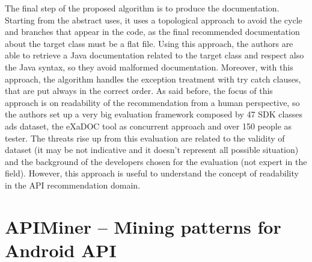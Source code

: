 The final step of the proposed algorithm is 
to produce the documentation. 
Starting from the abstract uses, it uses a 
topological approach to avoid the 
cycle and branches that appear in the code, 
as the final recommended 
documentation about the target class must 
be a flat file. Using this approach, 
the authors are able to retrieve a Java 
documentation related to the target 
class and respect also the Java syntax, so 
they avoid malformed documentation. 
Moreover, with this approach, the algorithm 
handles the exception treatment 
with try catch clauses, that are put always 
in the correct order. As said 
before, the focus of this approach is on 
readability of the recommendation from 
a human perspective, so the authors set up 
a very big evaluation framework 
composed by 47 SDK classes ads dataset, the 
eXaDOC tool as concurrent approach 
and over 150 people as tester. The threats 
rise up from this evaluation are 
related to the validity of dataset (it may 
be not indicative and it doesn't 
represent all possible situation) and the 
background of the developers chosen 
for the evaluation (not expert in the 
field). However, this approach is useful 
to understand the concept of readability in 
the API recommendation domain.

\section{APIMiner -- Mining patterns for 
Android API}

